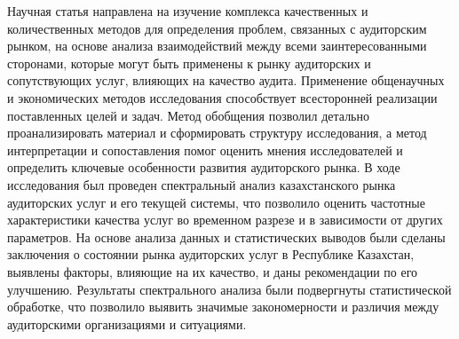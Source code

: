 Научная статья направлена на изучение комплекса качественных и
количественных методов для определения проблем, связанных с аудиторским
рынком, на основе анализа взаимодействий между всеми заинтересованными
сторонами, которые могут быть применены к рынку аудиторских и
сопутствующих услуг, влияющих на качество аудита. Применение общенаучных
и экономических методов исследования способствует всесторонней
реализации поставленных целей и задач. Метод обобщения позволил детально
проанализировать материал и сформировать структуру исследования, а метод
интерпретации и сопоставления помог оценить мнения исследователей и
определить ключевые особенности развития аудиторского рынка. В ходе
исследования был проведен спектральный анализ казахстанского рынка
аудиторских услуг и его текущей системы, что позволило оценить частотные
характеристики качества услуг во временном разрезе и в зависимости от
других параметров. На основе анализа данных и статистических выводов
были сделаны заключения о состоянии рынка аудиторских услуг в Республике
Казахстан, выявлены факторы, влияющие на их качество, и даны
рекомендации по его улучшению. Результаты спектрального анализа были
подвергнуты статистической обработке, что позволило выявить значимые
закономерности и различия между аудиторскими организациями и ситуациями.

